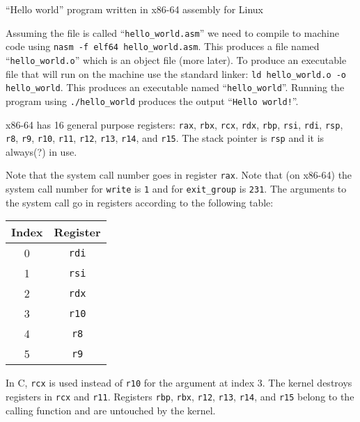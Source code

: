 \begin{listing}[H]
  \inputminted[frame=lines]{asm}{code/hello_world.asm}
  \caption{``Hello world'' program written in x86-64 assembly for Linux}
  \label{lst:hello-world-asm}
\end{listing}

Assuming the file is called ``\texttt{hello_world.asm}'' we need to
compile to machine code using \texttt{nasm -f elf64
  hello_world.asm}. This produces a file named
``\texttt{hello_world.o}'' which is an object file (more later). To
produce an executable file that will run on the machine use the standard linker:
\texttt{ld hello_world.o -o hello_world}. This produces an
executable named ``\texttt{hello_world}''. Running the program
using \texttt{./hello_world} produces the output
``\texttt{Hello world!}''.

x86-64 has 16 general purpose registers: \texttt{rax},
\texttt{rbx}, \texttt{rcx}, \texttt{rdx},
\texttt{rbp}, \texttt{rsi}, \texttt{rdi},
\texttt{rsp}, \texttt{r8}, \texttt{r9},
\texttt{r10}, \texttt{r11}, \texttt{r12},
\texttt{r13}, \texttt{r14}, and \texttt{r15}. The
stack pointer is \texttt{rsp} and it is always(?) in use.

Note that the system call number goes in register \texttt{rax}. Note
that (on x86-64) the system call number for \texttt{write} is
\texttt{1} and for \texttt{exit_group} is \texttt{231}. The arguments
to the system call go in registers according to the following table:

{\ttfamily\begin{tabular}{c c}
  \hline
  Index & Register \\
  \hline
  0 & \texttt{rdi} \\
  1 & \texttt{rsi} \\
  2 & \texttt{rdx} \\
  3 & \texttt{r10} \\
  4 & \texttt{r8} \\
  5 & \texttt{r9} \\
\end{tabular}}

In C, \texttt{rcx} is used instead of \texttt{r10} for the
argument at index 3. The kernel destroys registers in \texttt{rcx} and
\texttt{r11}. Registers \texttt{rbp}, \texttt{rbx},
\texttt{r12}, \texttt{r13}, \texttt{r14}, and
\texttt{r15} belong to the calling function and are untouched by the
kernel.
